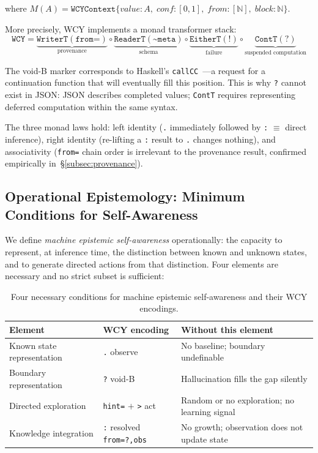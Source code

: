 \documentclass[11pt,a4paper]{article}
\begin{document}
where $M(A) = \texttt{WCYContext}\{\textit{value}: A,\; \textit{conf}: [0,1],\; \textit{from}: [\mathbb{N}],\; \textit{block}: \mathbb{N}\}$.

More precisely, WCY implements a monad transformer stack:
\[
\texttt{WCY} = \underbrace{\texttt{WriterT}(\texttt{from=})}_{\text{provenance}} \circ \underbrace{\texttt{ReaderT}(\texttt{\textasciitilde meta})}_{\text{schema}} \circ \underbrace{\texttt{EitherT}(\texttt{!})}_{\text{failure}} \circ \underbrace{\texttt{ContT}(\texttt{?})}_{\text{suspended computation}}
\]

The void-B marker corresponds to Haskell's \texttt{callCC}~\citep{moggi1991notions}---a request for a continuation function that will eventually fill this position. This is why \texttt{?} cannot exist in JSON: JSON describes completed values; \texttt{ContT} requires representing deferred computation within the same syntax.

The three monad laws hold: left identity (\texttt{.} immediately followed by \texttt{:} $\equiv$ direct inference), right identity (re-lifting a \texttt{:} result to \texttt{.} changes nothing), and associativity (\texttt{from=} chain order is irrelevant to the provenance result, confirmed empirically in~\S\ref{subsec:provenance}).

\subsection{Operational Epistemology: Minimum Conditions for Self-Awareness}

We define \emph{machine epistemic self-awareness} operationally: the capacity to represent, at inference time, the distinction between known and unknown states, and to generate directed actions from that distinction. Four elements are necessary and no strict subset is sufficient:

\begin{table}[H]
\centering
\small
\begin{tabular}{@{}llp{5.5cm}@{}}
\toprule
\textbf{Element} & \textbf{WCY encoding} & \textbf{Without this element} \\
\midrule
Known state representation & \texttt{.} observe & No baseline; boundary undefinable \\
Boundary representation & \texttt{?} void-B & Hallucination fills the gap silently \\
Directed exploration & \texttt{hint=} $+$ \texttt{>} act & Random or no exploration; no learning signal \\
Knowledge integration & \texttt{:} resolved \texttt{from=?,obs} & No growth; observation does not update state \\
\bottomrule
\end{tabular}
\caption{Four necessary conditions for machine epistemic self-awareness and their WCY encodings.}
\label{tab:epistemic}
\end{table}
\end{document}
